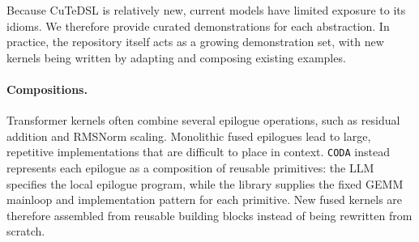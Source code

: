 Because CuTeDSL is relatively new, current models have limited exposure to its idioms. We therefore provide curated demonstrations for each abstraction. In practice, the repository itself acts as a growing demonstration set, with new kernels being written by adapting and composing existing examples.

\paragraph{Compositions.}
Transformer kernels often combine several epilogue operations, such as residual addition and RMSNorm scaling. Monolithic fused epilogues lead to large, repetitive implementations that are difficult to place in context. \texttt{CODA} instead represents each epilogue as a composition of reusable primitives: the LLM specifies the local epilogue program, while the library supplies the fixed GEMM mainloop and implementation pattern for each primitive. New fused kernels are therefore assembled from reusable building blocks instead of being rewritten from scratch.






